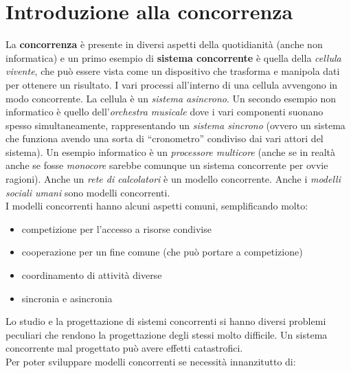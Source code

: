 \documentclass[a4paper,12pt, oneside]{book}
\begin{document}
\chapter{Introduzione alla concorrenza}
La \textbf{concorrenza} è presente in diversi aspetti della quotidianità (anche
non informatica) e un primo esempio di \textbf{sistema concorrente} è quella
della \textit{cellula vivente}, che può essere vista come un dispositivo che
trasforma e manipola dati per ottenere un risultato. I vari processi all'interno
di una cellula avvengono in modo concorrente. La cellula è un \textit{sistema
  asincrono}. Un secondo esempio non informatico 
è quello dell'\textit{orchestra musicale} dove i vari componenti suonano spesso
simultaneamente, rappresentando un \textit{sistema sincrono} (ovvero un sistema
che funziona avendo una sorta di ``cronometro'' condiviso dai vari attori del
sistema). Un esempio informatico è un \textit{processore multicore} (anche se in
realtà anche se fosse \textit{monocore} sarebbe comunque un sistema concorrente
per ovvie ragioni). Anche un \textit{rete di calcolatori} è un modello
concorrente. Anche i \textit{modelli sociali umani} sono modelli concorrenti.\\
I modelli concorrenti hanno alcuni aspetti comuni, semplificando molto:
\begin{itemize}
  \item competizione per l’accesso a risorse condivise
  \item cooperazione per un fine comune (che può portare a competizione)
  \item coordinamento di attività diverse
  \item sincronia e asincronia
\end{itemize}
Lo studio e la progettazione di sistemi concorrenti si hanno diversi problemi
peculiari che rendono la progettazione degli stessi molto difficile. Un sistema
concorrente mal progettato può avere effetti catastrofici.\\
Per poter sviluppare modelli concorrenti se necessità innanzitutto di:
\end{document}

